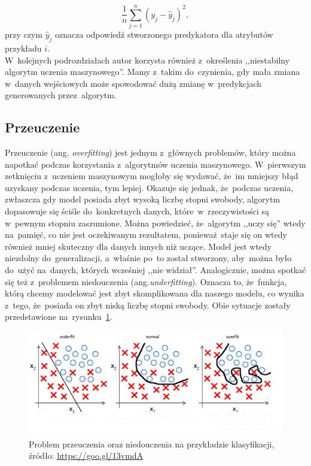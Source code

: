 \begin{equation}
\frac{1}{n} \sum_{j=1}^{n}(y_j - \hat{y}_j)^{2}, 
\end{equation}
przy czym $\hat{y}_j$ oznacza odpowiedź stworzonego predykatora dla atrybutów przykładu $i$.\\
W~kolejnych podrozdziałach autor korzysta również z~określenia ,,niestabilny algorytm uczenia maszynowego''. Mamy z~takim do~czynienia, gdy mała zmiana w~danych wejściowych może spowodować dużą zmianę w~predykcjach generowanych przez~algorytm\cite{ensemble}.

\subsection{Przeuczenie}\label{overfitting_section}
Przeuczenie (ang. \textit{overfitting}) jest jednym z~głównych problemów, który można napotkać podczas korzystania z~algorytmów uczenia maszynowego. W~pierwszym zetknięciu z~uczeniem maszynowym mogłoby się wydawać, że~im mniejszy błąd uzyskany podczas uczenia, tym lepiej. Okazuje się jednak, że~podczas uczenia, zwłaszcza gdy model posiada zbyt wysoką liczbę stopni swobody, algorytm dopasowuje się ściśle do~konkretnych danych, które~w~rzeczywistości są w~pewnym stopniu zaszumione. Można powiedzieć, że~algorytm ,,uczy się'' wtedy na~pamięć, co nie jest oczekiwanym rezultatem, ponieważ~staje się on wtedy również mniej skuteczny dla danych innych niż uczące.  Model jest wtedy niezdolny do~generalizacji, a~właśnie po~to został stworzony, aby~można było do~użyć na~danych, których wcześniej ,,nie widział''. Analogicznie, można spotkać się też z~problemem niedouczenia (ang.\textit{underfitting}). Oznacza to, że~funkcja, którą chcemy modelować jest zbyt skomplikowana dla naszego modelu, co wynika z~tego, że~posiada on zbyt niską liczbę stopni swobody. Obie sytuacje zostały przedstawione na~rysunku~\ref{overfitting}.

\begin{figure}[ht!]
\centering
\includegraphics[scale=0.8]{res/overfitting.png}
\caption[Caption for LOF]{Problem przeuczenia oraz niedouczenia na przykładzie klasyfikacji, źródło: \url{https://goo.gl/13vmdA}\label{overfitting}} 
\end{figure}

